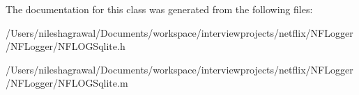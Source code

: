 The documentation for this class was generated from the following files\+:\begin{DoxyCompactItemize}
\item 
/\+Users/nileshagrawal/\+Documents/workspace/interviewprojects/netflix/\+N\+F\+Logger/\+N\+F\+Logger/N\+F\+L\+O\+G\+Sqlite.\+h\item 
/\+Users/nileshagrawal/\+Documents/workspace/interviewprojects/netflix/\+N\+F\+Logger/\+N\+F\+Logger/N\+F\+L\+O\+G\+Sqlite.\+m\end{DoxyCompactItemize}
